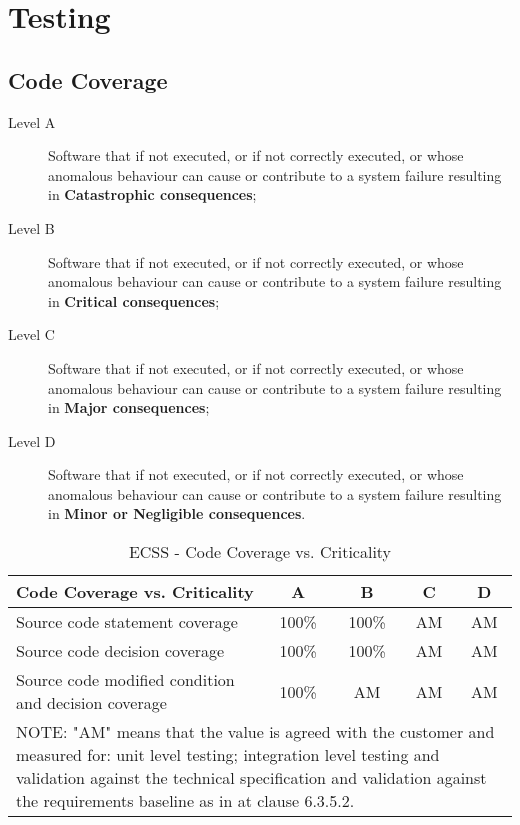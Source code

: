 \chapter{Testing}
\minitoc

\section{Code Coverage}
\cite{ecss-q-st-80c}

\begin{description}
\item[Level A] Software that if not executed, or if not correctly executed, or whose anomalous behaviour can cause or contribute to a system failure resulting in \textbf{Catastrophic consequences};
\item[Level B] Software that if not executed, or if not correctly executed, or whose anomalous behaviour can cause or contribute to a system failure resulting in \textbf{Critical consequences};
\item[Level C] Software that if not executed, or if not correctly executed, or whose anomalous behaviour can cause or contribute to a system failure resulting in \textbf{Major consequences};
\item[Level D] Software that if not executed, or if not correctly executed, or whose anomalous behaviour can cause or contribute to a system failure resulting in \textbf{Minor or Negligible consequences}.
\end{description}

\begin{table}[!ht]
\centering
\noindent \begin{tabular}{|m{6cm}|c|c|c|c|}
\hline
\textbf{Code Coverage vs. Criticality} & A & B & C & D \\\hline
Source code statement coverage & 100\% & 100\% & AM & AM \\\hline
Source code decision coverage & 100\% & 100\% & AM & AM \\\hline
Source code modified condition and decision coverage & 100\% & AM & AM & AM \\\hline
\multicolumn{5}{|m{14cm}|}{
NOTE: "AM" means that the value is agreed with the customer and measured for:
unit level testing; integration level testing and validation against the
technical specification and validation against the requirements baseline
as in \cite{ecss-q-st-80c} at clause 6.3.5.2.
}\\\hline
\end{tabular}
\caption{ECSS - Code Coverage vs. Criticality}\label{tab:ccoverage}
\end{table}

